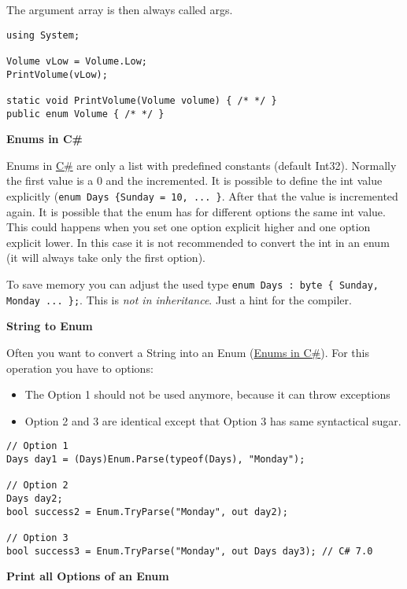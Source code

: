 \documentclass[11pt,twoside,landscape]{article}
\begin{document}
\begin{multicols}{3}
The argument array is then always called args.

\lstset{language=csharp,label= ,caption= ,captionpos=b,numbers=none}
\begin{lstlisting}
using System;

Volume vLow = Volume.Low;
PrintVolume(vLow);

static void PrintVolume(Volume volume) { /* */ }
public enum Volume { /* */ }
\end{lstlisting}

\textbf{Enums in C\#}

Enums in \href{../../../roam/20211003114158-c.org}{C\#} are only a list with predefined constants (default Int32).
Normally the first value is a 0 and the incremented.
It is possible to define the int value explicitly (\texttt{enum Days \{Sunday = 10, ... \}}.
After that the value is incremented again.
It is possible that the enum has for different options the same int value.
This could happens when you set one option explicit higher and one option explicit lower.
In this case it is not recommended to convert the int in an enum (it will always take only the first option).

To save memory you can adjust the used type \texttt{enum Days : byte \{ Sunday, Monday ... \};}.
This is \emph{not in inheritance}. Just a hint for the compiler.

\textbf{String to Enum}

Often you want to convert a String into an Enum (\href{../../../roam/20211006113326-enums_in_c.org}{Enums in C\#}).
For this operation you have to options:
\begin{itemize}
\item The Option 1 should not be used anymore, because it can throw exceptions
\item Option 2 and 3 are identical except that Option 3 has same syntactical sugar.
\end{itemize}

\lstset{language=csharp,label= ,caption= ,captionpos=b,numbers=none}
\begin{lstlisting}
// Option 1
Days day1 = (Days)Enum.Parse(typeof(Days), "Monday");

// Option 2
Days day2;
bool success2 = Enum.TryParse("Monday", out day2);

// Option 3
bool success3 = Enum.TryParse("Monday", out Days day3); // C# 7.0
\end{lstlisting}

\textbf{Print all Options of an Enum}


\end{multicols}
\end{document}
